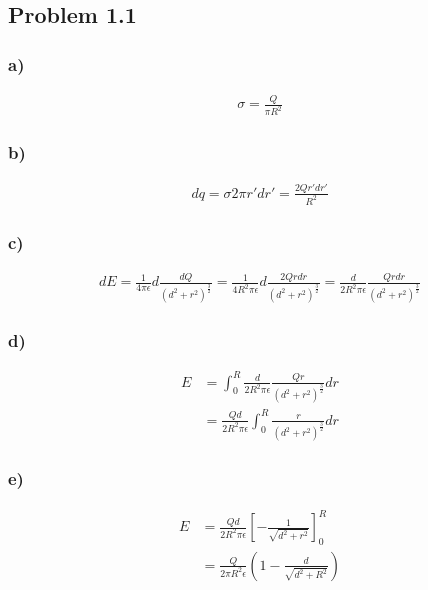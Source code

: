 \documentclass[../homework.tex]{subfiles}
\begin{document}
\subsection{Problem 1.1}
\subsubsection*{a)}
\begin{align*}
    \sigma = \frac{Q}{\pi R^2}
\end{align*}
\subsubsection*{b)}
\begin{align*}
    dq = \sigma 2\pi r' dr' =  \frac{2Q r' dr'}{R^2}
\end{align*}
\subsubsection*{c)}
\begin{align*}
    dE = \frac{1}{4 \pi \epsilon} d\frac{dQ}{(d^2 + r^2)^\frac{3}{2}} = \frac{1}{4 R^2 \pi \epsilon} d\frac{2Q r dr}{(d^2 + r^2)^\frac{3}{2}} = \frac{d}{2 R^2 \pi \epsilon} \frac{Q r dr}{(d^2 + r^2)^\frac{3}{2}}
\end{align*}
\subsubsection*{d)}
\begin{align*}
    E & = \int_{0}^{R} \frac{d}{2 R^2 \pi \epsilon} \frac{Q r}{(d^2 + r^2)^\frac{3}{2}} dr \\
      & = \frac{Qd}{2 R^2 \pi \epsilon}\int_{0}^{R} \frac{r}{(d^2 + r^2)^\frac{3}{2}} dr
\end{align*}
\subsubsection*{e)}
\begin{align*}
    E & = \frac{Qd}{2 R^2 \pi \epsilon} \left[
        - \frac{1}{\sqrt{d^2 + r^2}}
        \right]^R_0                            \\
      & = \frac{Q}{2 \pi R^2 \epsilon} \left(
    1 - \frac{d}{\sqrt{d^2 + R^2}}
    \right)
\end{align*}
\end{document}
